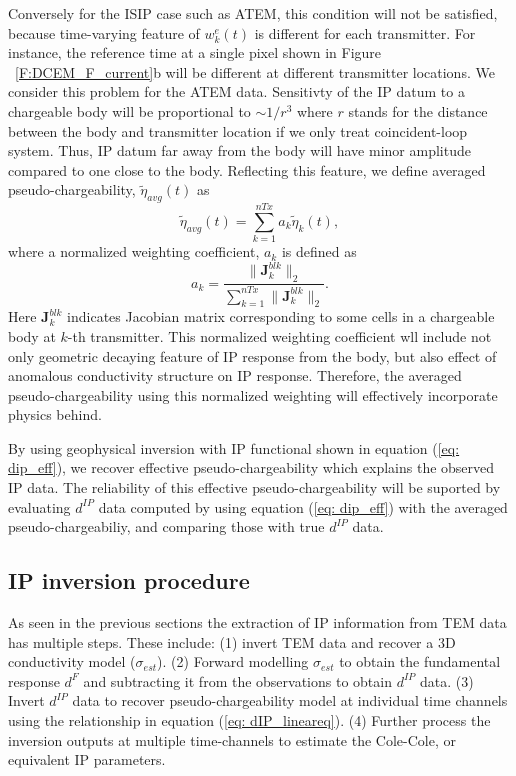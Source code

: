 \documentclass[a4paper, 11pt]{article}
\newcommand{\peta}{\tilde{\eta}}
\newcommand{\dip}{d^{IP}}
\begin{document}
Conversely for the ISIP case such as ATEM, this condition will not be satisfied, because time-varying feature of $w^e_k(t)$ is different for each transmitter. 
For instance, the reference time at a single pixel shown in Figure ~\ref{F:DCEM_F_current}b will be different at different transmitter locations. 
We consider this problem for the ATEM data. 
Sensitivty of the IP datum to a chargeable body will be proportional to $\sim1/r^3$ where $r$ stands for the distance between the body and transmitter location if we only treat coincident-loop system. 
Thus, IP datum far away from the body will have minor amplitude compared to one close to the body. 
Reflecting this feature, we define averaged pseudo-chargeability, $\peta_{avg}(t)$ as 
\begin{equation}
  \peta_{avg}(t) = \sum_{k=1}^{nTx} a_k \peta_k(t),
  \label{eq: pseudo-chargeability_avg}
\end{equation}
where a normalized weighting coefficient, $a_k$ is defined as 
\begin{equation}
  a_k = \frac{\| \mathbf{J}^{blk}_k \|_2  }{\sum_{k=1}^{nTx} \| \mathbf{J}^{blk}_k \|_2 }.
  \label{eq: normalized_weights}
\end{equation}
Here $\mathbf{J}^{blk}_k$ indicates Jacobian matrix corresponding to some cells in a chargeable body at $k$-th transmitter. 
This normalized weighting coefficient wll include not only geometric decaying feature of IP response from the body, but also effect of anomalous conductivity structure on IP response. 
Therefore, the averaged pseudo-chargeability using this normalized weighting will effectively incorporate physics behind. 

By using geophysical inversion with IP functional shown in equation (\ref{eq: dip_eff}), we recover effective pseudo-chargeability which explains the observed IP data. 
The reliability of this effective pseudo-chargeability will be suported by evaluating $\dip$ data computed by using equation (\ref{eq: dip_eff}) with the averaged pseudo-chargeabiliy, and comparing those with true $\dip$ data. 


\subsection{IP inversion procedure}
As seen in the previous sections the extraction of IP information from TEM data has multiple steps. These include: (1) invert TEM data and recover a 3D conductivity model ($\sigma_{est}$). 
(2) Forward modelling $\sigma_{est}$ to obtain the fundamental response $d^F$ and subtracting it from the observations to obtain $\dip$ data.
(3) Invert  $\dip$ data to recover pseudo-chargeability model at individual time channels using the relationship in equation (\ref{eq: dIP_lineareq}). 
(4) Further process the inversion outputs at multiple time-channels  to estimate the Cole-Cole, or equivalent IP parameters.
\end{document}
